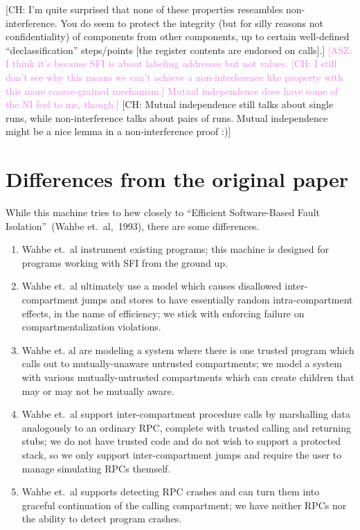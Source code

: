 \documentclass[12pt]{amsart}
\newif\ifdraft\drafttrue
\newcommand{\asz}[1]{\ifdraft\textcolor{violet}{[ASZ: #1]}\fi}
\newcommand{\comm}[3]{\ifdraft\textcolor{#1}{[#2: #3]}\fi}
\newcommand{\ch}[1]{\comm{dkgreen}{CH}{#1}} %
\begin{document}
\ch{I'm quite surprised that none of these properties reseambles
  non-interference. You do seem to protect the integrity (but for
  silly reasons not confidentiality) of components from other
  components, up to certain well-defined ``declassification''
  steps/points [the register contents are endorsed on calls].}%
\asz{I think it's because SFI is about labeling addresses but not values.
\ch{I still don't see why this means we can't achieve a non-interference
  like property with this more coarse-grained mechanism.}
  Mutual independence does have some of the NI feel to me, though.}
\ch{Mutual independence still talks about single runs, while
  non-interference talks about pairs of runs. Mutual independence
  might be a nice lemma in a non-interference proof :)}

\section{Differences from the original  paper}

While this machine tries to hew closely to ``Efficient Software-Based Fault
Isolation''~(Wahbe et.\ al,~1993), there are some differences.
\begin{enumerate}
\item Wahbe et.\ al instrument existing programs; this machine is designed for
  programs working with SFI from the ground up.

\item Wahbe et.\ al ultimately use a model which causes disallowed
  inter-compartment jumps and stores to have essentially random
  intra-compartment effects, in the name of efficiency; we stick with enforcing
  failure on compartmentalization violations.

\item Wahbe et. al are modeling a system where there is one trusted program
  which calls out to mutually-unaware untrusted compartments; we model a system
  with various mutually-untrusted compartments which can create children that
  may or may not be mutually aware.
  
\item Wahbe et.\ al support inter-compartment procedure calls by marshalling
  data analogously to an ordinary RPC, complete with trusted calling and
  returning stubs; we do not have trusted code and do not wish to support a
  protected stack, so we only support inter-compartment jumps and require the
  user to manage simulating RPCs themself.

\item Wahbe et.\ al supports detecting RPC crashes and can turn them into
  graceful continuation of the calling compartment; we have neither RPCs nor the
  ability to detect program crashes.
\end{enumerate}
\end{document}
